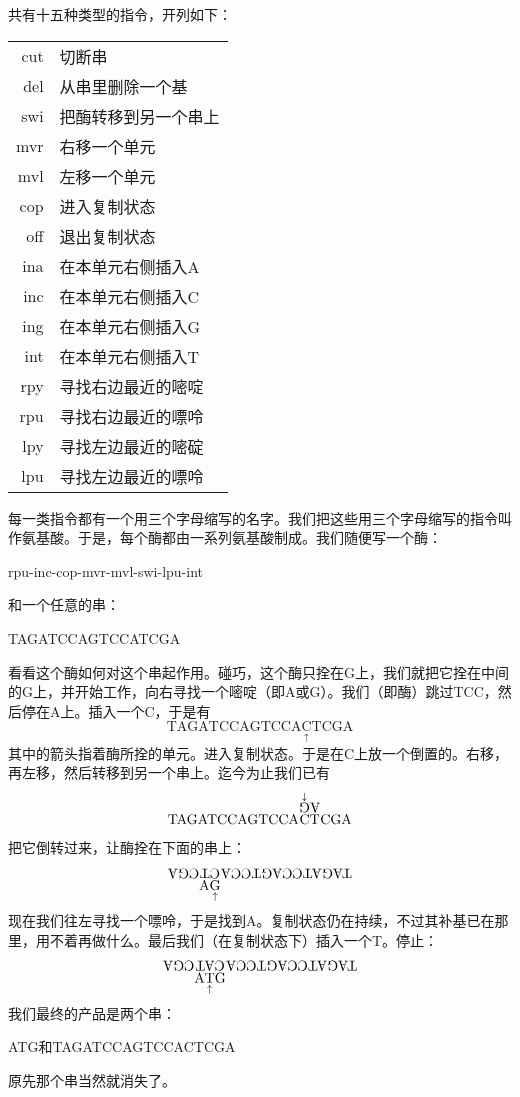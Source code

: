 共有十五种类型的指令，开列如下：
\begin{longtable}[c]{r!{——}l}
cut & 切断串\\
del & 从串里删除一个基\\
swi & 把酶转移到另一个串上\\
mvr & 右移一个单元\\
mvl & 左移一个单元\\
cop & 进入复制状态\\
off & 退出复制状态\\
ina & 在本单元右侧插入A\\
inc & 在本单元右侧插入C\\
ing & 在本单元右侧插入G\\
int & 在本单元右侧插入T\\
rpy & 寻找右边最近的嘧啶\\
rpu & 寻找右边最近的嘌呤\\
lpy & 寻找左边最近的嘧碇\\
lpu & 寻找左边最近的嘌呤
\end{longtable}
每一类指令都有一个用三个字母缩写的名字。我们把这些用三个字母缩写的指令叫作氨基酸。于是，每个酶都由一系列氨基酸制成。我们随便写一个酶：
\begin{center}
rpu-inc-cop-mvr-mvl-swi-lpu-int
\end{center}
和一个任意的串：
\begin{center}
TAGATCCAGTCCATCGA
\end{center}
看看这个酶如何对这个串起作用。碰巧，这个酶只拴在G上，我们就把它拴在中间的G上，并开始工作，向右寻找一个嘧啶（即A或G）。我们（即酶）跳过TCC，然后停在A上。插入一个C，于是有
\[
\mathrm{TAGATCCAGTCCA}\underset{\uparrow}{\mathrm{C}}\mathrm{TCGA}
\]
其中的箭头指着酶所拴的单元。进入复制状态。于是在C上放一个倒置的\relax\CJKecglue{}。右移，再左移，然后转移到另一个串上。迄今为止我们已有
\[
\mathrm{TAGATCCAGTCCA}
\begin{array}[b]{@{}c@{}}
\overset{\downarrow}{\rotatebox[origin=c]{180}{G}}
\rotatebox[origin=c]{180}{A}\\[-\dp\strutbox]
\mathrm{CT}
\end{array}
\mathrm{CGA}
\]
把它倒转过来，让酶拴在下面的串上：
\[
\rotatebox[origin=c]{180}{CGA}
\begin{array}[t]{@{}c@{}}
\rotatebox[origin=c]{180}{CT}\\[-\dp\strutbox]
\mathrm{A}\underset{\uparrow}{\mathrm{G}}
\end{array}
\rotatebox[origin=c]{180}{TAGATCCAGTCCA}
\]
现在我们往左寻找一个嘌呤，于是找到A。复制状态仍在持续，不过其补基已在那里，用不着再做什么。最后我们（在复制状态下）插入一个T。停止：
\[
\rotatebox[origin=c]{180}{CGA}
\begin{array}[t]{@{}c@{}}
\rotatebox[origin=c]{180}{CAT}\\[-\dp\strutbox]
\mathrm{A}\underset{\uparrow}{\mathrm{T}}\mathrm{G}
\end{array}
\rotatebox[origin=c]{180}{TAGATCCAGTCCA}
\]
我们最终的产品是两个串：
\begin{center}
ATG\quad 和\quad TAGATCCAGTCCACTCGA
\end{center}
原先那个串当然就消失了。


